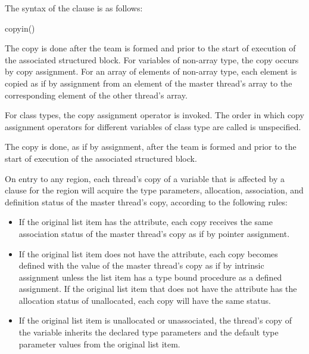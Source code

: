 \syntax
The syntax of the  clause is as follows:

\begin{ompSyntax}
copyin()
\end{ompSyntax}

\descr
\begin{ccppspecific}
The copy is done after the team is formed and prior to the start of execution of the
associated structured block. For variables of non-array type, the copy occurs by copy
assignment. For an array of elements of non-array type, each element is copied as if by
assignment from an element of the master thread's array to the corresponding element of
the other thread's array.
\end{ccppspecific}

\begin{cppspecific}
For class types, the copy assignment operator is invoked. The order in which copy
assignment operators for different variables of class type are called is unspecified.
\end{cppspecific}

\begin{fortranspecific}
The copy is done, as if by assignment, after the team is formed and prior to the start of
execution of the associated structured block.

On entry to any  region, each thread's copy of a variable that is affected by
a  clause for the  region will acquire the
type parameters, allocation, association, and
definition status of the master thread's copy, according to the following rules:

\begin{itemize}
\item If the original list item has the  attribute, each copy receives the same
association status of the master thread's copy as if by pointer assignment.

\item If the original list item does not have the 
attribute, each copy becomes defined with the value of the master
thread's copy as if by intrinsic assignment unless the list item has
a type bound procedure as a defined assignment.  If the original
list item that does not have the  attribute has the
allocation status of unallocated, each copy will have the same
status.

\item If the original list item is unallocated or unassociated, the
thread's copy of the variable inherits the declared type parameters
and the default type parameter values from the original list item.
\end{itemize}
\end{fortranspecific}


